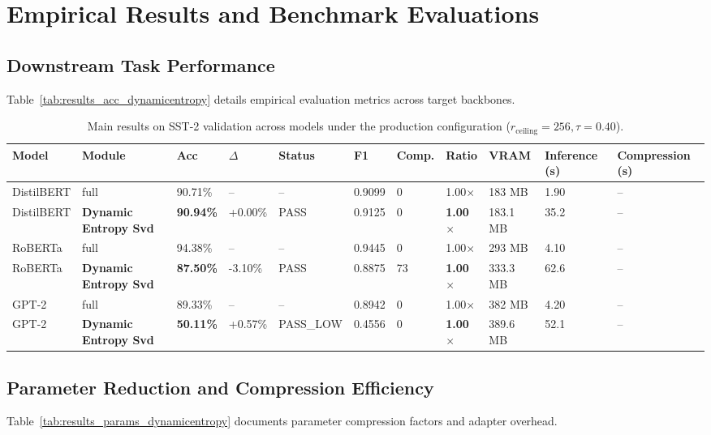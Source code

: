 \section{Empirical Results and Benchmark Evaluations}

\subsection{Downstream Task Performance}
Table~\ref{tab:results_acc_dynamicentropy} details empirical evaluation metrics across target backbones.

\begin{table}[t]
\centering
\small
\begin{tabular}{lllllllllll}
\toprule
\textbf{Model} & \textbf{Module} & \textbf{Acc} & \textbf{$\Delta$} & \textbf{Status} & \textbf{F1} & \textbf{Comp.} & \textbf{Ratio} & \textbf{VRAM} & \textbf{Inference (s)} & \textbf{Compression (s)} \\
\midrule
DistilBERT & full & 90.71\% & -- & -- & 0.9099 & 0 & 1.00$\times$ & 183 MB & 1.90 & -- \\
DistilBERT & \textbf{Dynamic Entropy Svd} & \textbf{90.94\%} & +0.00\% & PASS & 0.9125 & 0 & \textbf{1.00$\times$} & 183.1 MB & 35.2 & -- \\
RoBERTa & full & 94.38\% & -- & -- & 0.9445 & 0 & 1.00$\times$ & 293 MB & 4.10 & -- \\
RoBERTa & \textbf{Dynamic Entropy Svd} & \textbf{87.50\%} & -3.10\% & PASS & 0.8875 & 73 & \textbf{1.00$\times$} & 333.3 MB & 62.6 & -- \\
GPT-2 & full & 89.33\% & -- & -- & 0.8942 & 0 & 1.00$\times$ & 382 MB & 4.20 & -- \\
GPT-2 & \textbf{Dynamic Entropy Svd} & \textbf{50.11\%} & +0.57\% & PASS\_LOW & 0.4556 & 0 & \textbf{1.00$\times$} & 389.6 MB & 52.1 & -- \\
\bottomrule
\end{tabular}
\caption{Main results on SST-2 validation across models under the production configuration ($r_{\mathrm{ceiling}}=256, \tau=0.40$).}
\label{tab:main_sst2}
\end{table}

\subsection{Parameter Reduction and Compression Efficiency}
Table~\ref{tab:results_params_dynamicentropy} documents parameter compression factors and adapter overhead.

